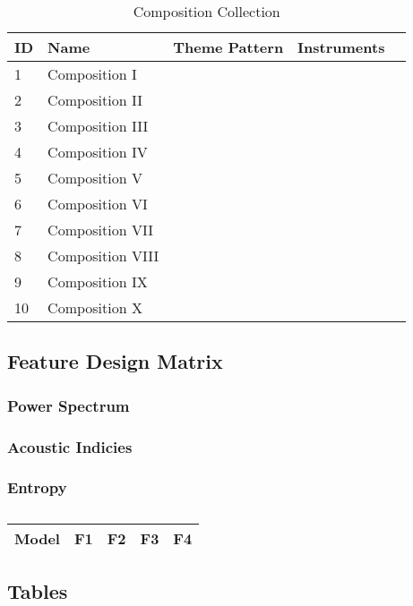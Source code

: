 \begin{table}[H]
\caption{Composition Collection}	
\begin{tabular}{p{1cm}p{4cm}p{2cm}p{1cm}p{1cm}}
\hline
ID & Name & Theme Pattern & Instruments & \\
\hline 
1 & Composition I &  &  & \\
2 & Composition II &  &  & \\
3 & Composition III &  & \\
4 & Composition IV & & \\
5 & Composition V & & & \\
\hline 
6 & Composition VI &  &  & \\
7 & Composition VII &  &  & \\
8 & Composition VIII &  & \\
9 & Composition IX & & \\
10 & Composition X & & & \\
\end{tabular}
\end{table}

\subsection{Feature Design Matrix}

\subsubsection{Power Spectrum}

\subsubsection{Acoustic Indicies}

\subsubsection{Entropy}

\centering	
\begin{table}[H]\tiny
	\caption{}	
	\begin{tabular}{p{1cm}p{1cm}p{1cm}p{1cm}p{1cm}}
		\hline	
		Model & F1 & F2 & F3 & F4 \\
		\hline 
		\hline 
	\end{tabular}
\end{table}

\subsection{Tables}

